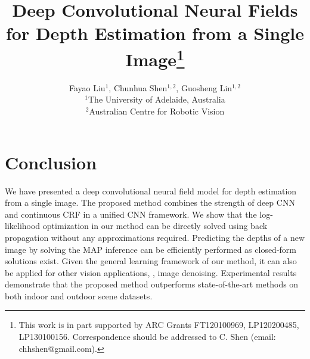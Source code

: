 \documentclass[10pt,twocolumn,letterpaper]{article}
\newcommand{\crf}{{CRF}\xspace}
\newcommand{\cnn}{{CNN}\xspace}
\begin{document}
\title{Deep Convolutional Neural Fields for Depth Estimation from a Single Image\thanks{
    This work is in part supported by ARC Grants FT120100969, LP120200485, LP130100156.
    Correspondence should be addressed to C. Shen (email: chhshen@gmail.com).
  }
}


\author{
Fayao Liu$^1$,
Chunhua Shen$^{1,2}$,
Guosheng Lin$^{1,2}$
\\
$^1$The University of Adelaide, Australia
\\
$^2$Australian Centre for Robotic Vision
}


\maketitle






















\section{Conclusion}
We have presented a deep convolutional neural field model for depth estimation from a single image.
%
The proposed method combines the strength of deep \cnn and continuous \crf
%
in a unified \cnn framework.
We show that the log-likelihood optimization in our method can be directly solved using back propagation without any approximations required.
Predicting the depths of a new image by solving the MAP inference can be efficiently performed as closed-form solutions exist.
Given the general learning framework of our method, it can also be applied for other vision applications, \eg, image denoising.
%
Experimental results demonstrate that the proposed method outperforms state-of-the-art methods on both indoor and outdoor scene datasets.
%


\appendix

\onecolumn





\clearpage
{\small
    
    
}



%
%
%
%
%
\end{document}
